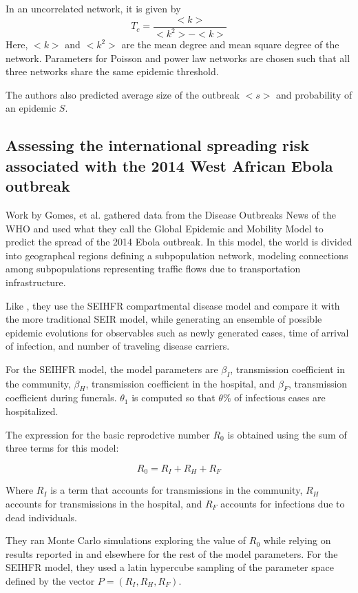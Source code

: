 \documentclass[12pt, journal,onecolumn]{IEEEtran}
\begin{document}
In an uncorrelated network, it is given by
\[
T_c =\dfrac{<k>}{<k^2> - <k>}
\]
Here, $<k>$ and $<k^2>$ are the mean degree and mean square degree of the network. Parameters for Poisson and power law networks are chosen such that all three networks share the same epidemic threshold.

The authors also predicted average size of the outbreak $<s>$ and probability of an epidemic $S$. 





\subsection{Assessing the international spreading risk associated with the 2014 West African Ebola outbreak \cite{gomes2014assessing} }

Work by Gomes, et al. \cite{gomes2014assessing} gathered data from the Disease Outbreaks News of
the WHO and used what they call the Global Epidemic and Mobility Model to predict the spread of the
2014 Ebola outbreak. In this model, the world is divided into geographcal regions defining a
subpopulation network, modeling connections among subpopulations representing traffic flows due to
transportation infrastructure.

Like \cite{legrand2007understanding}, they use the SEIHFR compartmental disease model and compare
it with the more traditional SEIR model, while
generating an ensemble of possible epidemic evolutions for observables such as newly generated
cases, time of arrival of infection, and number of traveling disease carriers.

For the SEIHFR model, the model parameters are $\beta_I$, transmission coefficient in the
community, $\beta_H$, transmission coefficient in the hospital, and $\beta_F$, transmission
coefficient during funerals. $\theta_1$ is computed so that $\theta\%$ of infectious cases
are hospitalized.

The expression for the basic reprodctive number $R_0$ is obtained using the sum of three terms
for this model:

$$
R_0 = R_I + R_H + R_F
$$

Where $R_I$ is a term that accounts for transmissions in the community, $R_H$ accounts for
transmissions in the hospital, and $R_F$ accounts for infections due to dead individuals.

They ran Monte Carlo simulations exploring the value of $R_0$ while relying on results reported
in \cite{legrand2007understanding} and elsewhere for the rest of the model parameters.
For the SEIHFR model, they used a latin hypercube sampling of the parameter space defined by the
vector $P = (R_I, R_H, R_F)$.
\end{document}
